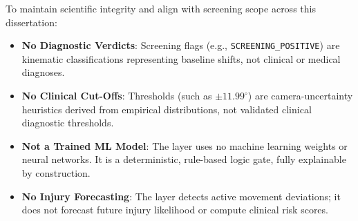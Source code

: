 To maintain scientific integrity and align with screening scope across this dissertation:
\begin{itemize}
  \item \textbf{No Diagnostic Verdicts}: Screening flags (e.g., \texttt{SCREENING\_POSITIVE}) are kinematic classifications representing baseline shifts, not clinical or medical diagnoses.
  \item \textbf{No Clinical Cut-Offs}: Thresholds (such as $\pm 11.99^\circ$) are camera-uncertainty heuristics derived from empirical distributions, not validated clinical diagnostic thresholds.
  \item \textbf{Not a Trained ML Model}: The layer uses no machine learning weights or neural networks. It is a deterministic, rule-based logic gate, fully explainable by construction.
  \item \textbf{No Injury Forecasting}: The layer detects active movement deviations; it does not forecast future injury likelihood or compute clinical risk scores.
\end{itemize}